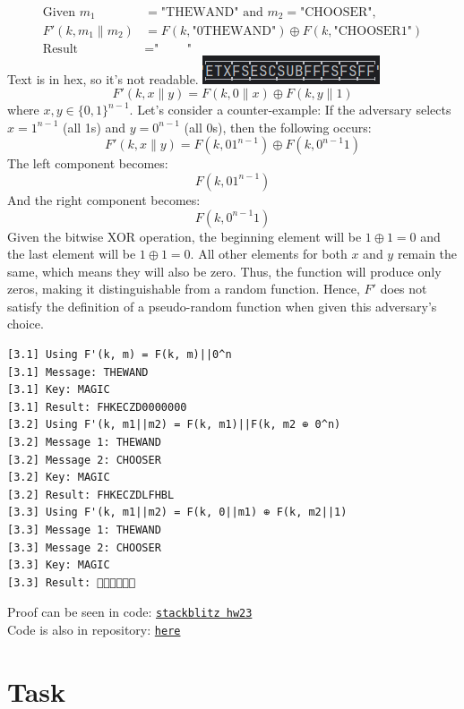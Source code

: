 \documentclass{article}
\begin{document}
\begin{align*}
  \text{Given } m_1 &= \text{"THEWAND"} \text{ and } m_2 = \text{"CHOOSER"}, \\
  F'(k, m_1 \parallel m_2) &= F(k, \text{"0THEWAND"}) \oplus F(k, \text{"CHOOSER1"}) \\
  \text{Result} &= \text{""}
\end{align*}
Text is in hex, so it's not readable. \includegraphics{img}\\
\[ F'(k, x\|y) = F(k, 0\|x) \oplus F(k, y\|1) \]
where \( x, y \in \{0, 1\}^{n-1} \).
Let's consider a counter-example:
If the adversary selects \( x = 1^{n-1} \) (all 1s) and \( y = 0^{n-1} \) (all 0s), then the following occurs:
\[ F'(k, x\|y) = F(k, 01^{n-1}) \oplus F(k, 0^{n-1}1) \]
The left component becomes:
\[ F(k, 01^{n-1}) \]
And the right component becomes:
\[ F(k, 0^{n-1}1) \]
Given the bitwise XOR operation, the beginning element will be \( 1 \oplus 1 = 0 \) and the last element will be \( 1 \oplus 1 = 0 \).
All other elements for both \( x \) and \( y \) remain the same, which means they will also be zero.
Thus, the function will produce only zeros, making it distinguishable from a random function.
Hence, \( F' \) does not satisfy the definition of a pseudo-random function when given this adversary's choice.



\begin{verbatim}
[3.1] Using F'(k, m) = F(k, m)||0^n
[3.1] Message: THEWAND
[3.1] Key: MAGIC
[3.1] Result: FHKECZD0000000
[3.2] Using F'(k, m1||m2) = F(k, m1)||F(k, m2 ⊕ 0^n)
[3.2] Message 1: THEWAND
[3.2] Message 2: CHOOSER
[3.2] Key: MAGIC
[3.2] Result: FHKECZDLFHBL
[3.3] Using F'(k, m1||m2) = F(k, 0||m1) ⊕ F(k, m2||1)
[3.3] Message 1: THEWAND
[3.3] Message 2: CHOOSER
[3.3] Key: MAGIC
[3.3] Result: 
\end{verbatim}

Proof can be seen in code: \href{https://stackblitz.com/edit/js-ekqepc?devtoolsheight=80&file=hw23.js&hideDevTools=false}{\texttt{stackblitz hw23}}\\
Code is also in repository: \href{https://github.com/Nurech/js-ekqepc}{\texttt{here}}

\section{Task}%
\end{document}
